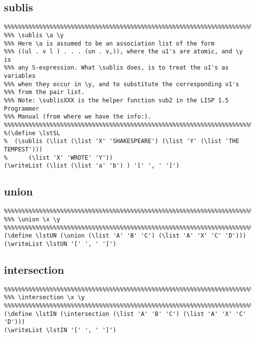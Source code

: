 \documentclass[10pt,a4paper]{article}
\begin{document}
\subsection{sublis}
\begin{verbatim}
%%%%%%%%%%%%%%%%%%%%%%%%%%%%%%%%%%%%%%%%%%%%%%%%%%%%%%%%%%%%%%%%%%%%%%%%%%%%%
%%% \sublis \a \y 
%%% Here \a is assumed to be an association list of the form 
%%% ((ul . v l ) . . . (un . v,)), where the u1's are atomic, and \y is 
%%% any S-expression. What \sublis does, is to treat the u1's as variables 
%%% when they occur in \y, and to substitute the corresponding v1's
%%% from the pair list. 
%%% Note: \sublisXXX is the helper function sub2 in the LISP 1.5 Programmer
%%% Manual (from where we have the info:).
%%%%%%%%%%%%%%%%%%%%%%%%%%%%%%%%%%%%%%%%%%%%%%%%%%%%%%%%%%%%%%%%%%%%%%%%%%%%%
%(\define \lstSL 
%  (\sublis (\list (\list 'X' 'SHAKESPEARE') (\list 'Y' (\list 'THE TEMPEST'))) 
%      (\list 'X' 'WROTE' 'Y'))
(\writeList (\list (\list 'a' 'b') ) '[' ', ' ']')
\end{verbatim}

\begin{framed}
\noindent
{}
\end{framed}

\subsection{union}
\begin{verbatim}
%%%%%%%%%%%%%%%%%%%%%%%%%%%%%%%%%%%%%%%%%%%%%%%%%%%%%%%%%%%%%%%%%%%%%%%%%%%%%
%%% \union \x \y 
%%%%%%%%%%%%%%%%%%%%%%%%%%%%%%%%%%%%%%%%%%%%%%%%%%%%%%%%%%%%%%%%%%%%%%%%%%%%%
(\define \lstUN (\union (\list 'A' 'B' 'C') (\list 'A' 'X' 'C' 'D'))) 
(\writeList \lstUN '[' ', ' ']')
\end{verbatim}

\begin{framed}
\noindent
{}
\end{framed}

\subsection{intersection}
\begin{verbatim}
%%%%%%%%%%%%%%%%%%%%%%%%%%%%%%%%%%%%%%%%%%%%%%%%%%%%%%%%%%%%%%%%%%%%%%%%%%%%%
%%% \intersection \x \y 
%%%%%%%%%%%%%%%%%%%%%%%%%%%%%%%%%%%%%%%%%%%%%%%%%%%%%%%%%%%%%%%%%%%%%%%%%%%%%
(\define \lstIN (\intersection (\list 'A' 'B' 'C') (\list 'A' 'X' 'C' 'D'))) 
(\writeList \lstIN '[' ', ' ']')
\end{verbatim}
\end{document}
